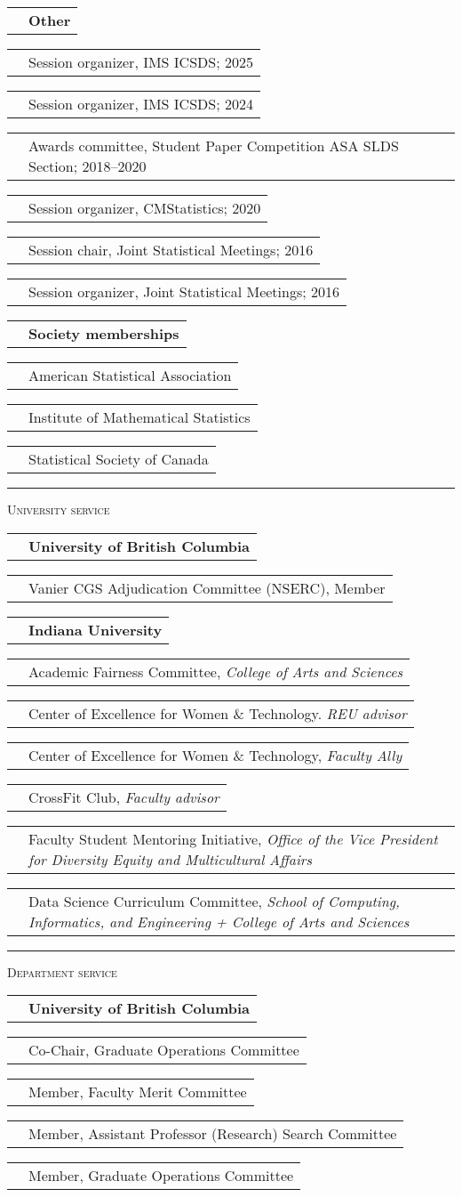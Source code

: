 \documentclass[11pt,letterpaper]{minimal/moderncv}
\makeatletter
\newcommand{\xx}{\textcolor{white}{2022}}
\newcommand{\xxx}{\textcolor{white}{--2022}}
\renewcommand{\cventry}[2]{\cvitem{#1}{\begin{minipage}[t]{\maincolumnwidth}#2\end{minipage}}}
\newcommand{\bolditem}[1]{\cvitem{}{\textbf{#1}}}
\renewcommand{\section}[1]{  \par\addvspace{15pt}%
  \parbox[t]{\hintscolumnwidth}{\strut\raggedleft\raisebox{4pt}%
  {\rule{\hintscolumnwidth}{2pt}}}%
  \hspace{\separatorcolumnwidth}%
  \textsc{\Large #1}\par\nobreak\addvspace{6pt}%
}
\renewcommand*{\cvitem}[2]{%
  \begin{tabular}{@{}p{\hintscolumnwidth}@{\hspace{\separatorcolumnwidth}}%
    p{\maincolumnwidth}@{}}%
    \raggedleft {#1} &  {#2}%
  \end{tabular}%
}
\makeatother
\begin{document}
\vspace{6pt}
\bolditem{Other}
\cvitem{}{Session organizer, IMS ICSDS; 2025}
\cvitem{}{Session organizer, IMS ICSDS; 2024}
\cvitem{}{Awards committee, Student Paper Competition ASA SLDS
  Section; 2018--2020}
\cvitem{}{Session organizer, CMStatistics; 2020}
\cvitem{}{Session chair, Joint Statistical Meetings; 2016}
\cvitem{}{Session organizer, Joint Statistical Meetings; 2016}

\vspace{6pt}
\bolditem{Society memberships}
\cvitem{}{American Statistical Association}
\cvitem{}{Institute of Mathematical Statistics}
\cvitem{}{Statistical Society of Canada}

\section{University service}

\cvitem{}{\textbf{University of British Columbia}}
\cventry{2021--2022}{Vanier CGS Adjudication Committee (NSERC), Member }

\vspace{6pt}
\cvitem{}{\textbf{Indiana University}}
\cventry{2019--2020}{Academic Fairness Committee, \emph{College of Arts and Sciences}}

\cventry{2019--2020}{Center of Excellence for Women \& Technology. \emph{REU
  advisor}}

\cventry{2017--2020}{Center of Excellence for Women \& Technology, \emph{Faculty
Ally}}

\cventry{2015--2020}{CrossFit Club, \emph{Faculty advisor}}

\cventry{2016--2018}{Faculty Student Mentoring Initiative, \emph{Office of the
  Vice President for Diversity Equity and Multicultural Affairs}}

\cventry{2014--2018}{Data Science Curriculum Committee, \emph{School
    of Computing, Informatics, and Engineering + College of Arts and Sciences}}






\section{Department service}

\cvitem{}{\textbf{University of British Columbia}}
\cventry{2022--2024}{Co-Chair, Graduate Operations Committee}
\cventry{2022\xxx}{Member, Faculty Merit Committee}
\cventry{2021--2022}{Member, Assistant Professor (Research) Search Committee}
\cventry{2020--\xx}{Member, Graduate Operations Committee}
\end{document}
